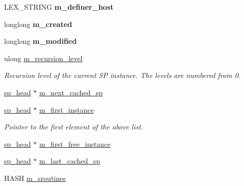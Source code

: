 \begin{DoxyCompactItemize}
\item 
\mbox{\label{classsp__head_a9bde7186173cfbf1aa442feaa458d05b}} 
L\+E\+X\+\_\+\+S\+T\+R\+I\+NG {\bfseries m\+\_\+definer\+\_\+host}
\item 
\mbox{\label{classsp__head_a3465517562f6b4a445594c650980b5e7}} 
longlong {\bfseries m\+\_\+created}
\item 
\mbox{\label{classsp__head_aa779525c25debfd42b3c1aafd17db13a}} 
longlong {\bfseries m\+\_\+modified}
\item 
\mbox{\label{classsp__head_a32d1ce8702cb51f35b9de5475037da9a}} 
ulong \mbox{\hyperlink{classsp__head_a32d1ce8702cb51f35b9de5475037da9a}{m\+\_\+recursion\+\_\+level}}
\begin{DoxyCompactList}\small\item\em Recursion level of the current SP instance. The levels are numbered from 0. \end{DoxyCompactList}\item 
\mbox{\hyperlink{classsp__head}{sp\+\_\+head}} $\ast$ \mbox{\hyperlink{classsp__head_ac847a6b14ed40b05c7587891b419adc3}{m\+\_\+next\+\_\+cached\+\_\+sp}}
\item 
\mbox{\label{classsp__head_a3cdc3a02699fd59bc9b54f4296354709}} 
\mbox{\hyperlink{classsp__head}{sp\+\_\+head}} $\ast$ \mbox{\hyperlink{classsp__head_a3cdc3a02699fd59bc9b54f4296354709}{m\+\_\+first\+\_\+instance}}
\begin{DoxyCompactList}\small\item\em Pointer to the first element of the above list. \end{DoxyCompactList}\item 
\mbox{\hyperlink{classsp__head}{sp\+\_\+head}} $\ast$ \mbox{\hyperlink{classsp__head_ad340ae0be6cb8ce662082c48cfc03d27}{m\+\_\+first\+\_\+free\+\_\+instance}}
\item 
\mbox{\hyperlink{classsp__head}{sp\+\_\+head}} $\ast$ \mbox{\hyperlink{classsp__head_ae0c36bbb7794aab5f12f10bb29f3e31f}{m\+\_\+last\+\_\+cached\+\_\+sp}}
\item 
H\+A\+SH \mbox{\hyperlink{classsp__head_ab26a4954ad2a135c3876fa3e0f738ed9}{m\+\_\+sroutines}}
\item 
\mbox{\label{classsp__head_a442d114d3644a71a454e8c8f22b8c6ba}} 

\end{DoxyCompactItemize}
